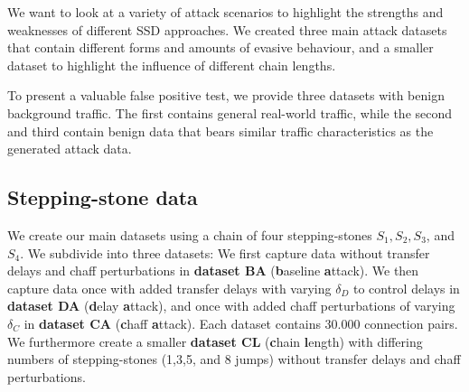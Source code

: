 \documentclass[runningheads,11pt]{llncs}\usepackage[]{graphicx}\usepackage[]{color}
\begin{document}

We want to look at a variety of attack scenarios to highlight the strengths and weaknesses of different SSD approaches. We created three main attack datasets that contain different forms and amounts of evasive behaviour, and a smaller dataset to highlight the influence of different chain lengths. 

To present a valuable false positive test, we provide three datasets with benign background traffic. The first contains general real-world traffic, while the second and third contain benign data that bears similar traffic characteristics as the generated attack data. %


\subsection{Stepping-stone data}

We create our main datasets using a chain of four stepping-stones $S_1, S_2, S_3$, and $S_4$. We subdivide into three datasets: We first capture data without transfer delays and chaff perturbations in \textbf{dataset BA} (\textbf{b}aseline \textbf{a}ttack). We then capture data once with added transfer delays with varying $\delta_D$ to control delays in \textbf{dataset DA} (\textbf{d}elay \textbf{a}ttack), and once with added chaff perturbations of varying $\delta_C$ in \textbf{dataset CA} (\textbf{c}haff \textbf{a}ttack). Each dataset contains 30.000 connection pairs.
We furthermore create a smaller \textbf{dataset CL} (\textbf{c}hain \textbf{l}ength) with differing numbers of stepping-stones (1,3,5, and 8 jumps) without transfer delays and chaff perturbations.%
\end{document}
